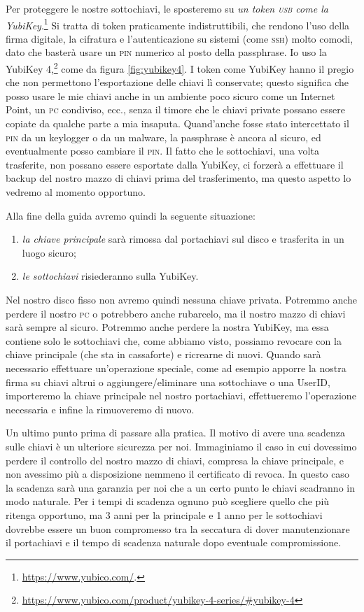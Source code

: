 Per proteggere le nostre sottochiavi, le sposteremo su \emph{un token
\textsc{usb} come la YubiKey}.\footnote{\url{https://www.yubico.com/}.} Si
tratta di token praticamente indistruttibili, che rendono l'uso della firma
digitale, la cifratura e l'autenticazione su sistemi (come \textsc{ssh}) molto
comodi, dato che basterà usare un \textsc{pin} numerico al posto della
passphrase. Io uso la YubiKey
4,\footnote{\url{https://www.yubico.com/product/yubikey-4-series/\#yubikey-4}}
come da figura \ref{fig:yubikey4}. I token come YubiKey hanno il pregio che non
permettono l'esportazione delle chiavi lì conservate; questo significa che posso
usare le mie chiavi anche in un ambiente poco sicuro come un Internet Point, un
\textsc{pc} condiviso, ecc., senza il timore che le chiavi private possano
essere copiate da qualche parte a mia insaputa. Quand'anche fosse stato
intercettato il \textsc{pin} da un keylogger o da un malware, la passphrase è
ancora al sicuro, ed eventualmente posso cambiare il \textsc{pin}. Il fatto che
le sottochiavi, una volta trasferite, non possano essere esportate dalla
YubiKey, ci forzerà a effettuare il backup del nostro mazzo di chiavi prima del
trasferimento, ma questo aspetto lo vedremo al momento opportuno.

Alla fine della guida avremo quindi la seguente situazione:

\begin{enumerate}
  \item \emph{la chiave principale} sarà rimossa dal portachiavi sul disco e trasferita
  in un luogo sicuro;
  \item \emph{le sottochiavi} risiederanno sulla YubiKey.
\end{enumerate}

Nel nostro disco fisso non avremo quindi nessuna chiave privata. Potremmo anche
perdere il nostro \textsc{pc} o potrebbero anche rubarcelo, ma il nostro mazzo
di chiavi sarà sempre al sicuro. Potremmo anche perdere la nostra YubiKey, ma
essa contiene solo le sottochiavi che, come abbiamo visto, possiamo revocare con
la chiave principale (che sta in cassaforte) e ricrearne di nuovi. Quando sarà
necessario effettuare un'operazione speciale, come ad esempio apporre la nostra
firma su chiavi altrui o aggiungere/eliminare una sottochiave o una UserID,
importeremo la chiave principale nel nostro portachiavi, effettueremo
l'operazione necessaria e infine la rimuoveremo di nuovo.\bigskip

\noindent Un ultimo punto prima di passare alla pratica. Il motivo di avere una
scadenza sulle chiavi è un ulteriore sicurezza per noi. Immaginiamo il caso in
cui dovessimo perdere il controllo del nostro mazzo di chiavi, compresa la
chiave principale, e non avessimo più a disposizione nemmeno il certificato di
revoca. In questo caso la scadenza sarà una garanzia per noi che a un certo
punto le chiavi scadranno in modo naturale. Per i tempi di scadenza ognuno può
scegliere quello che più ritenga opportuno, ma 3 anni per la principale e 1 anno
per le sottochiavi dovrebbe essere un buon compromesso tra la seccatura di dover
manutenzionare il portachiavi e il tempo di scadenza naturale dopo eventuale
compromissione.\bigskip

